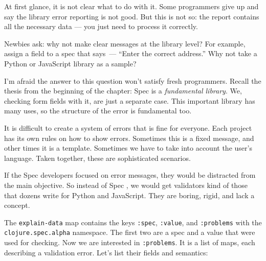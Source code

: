 
At first glance, it is not clear what to do with it. Some programmers give up and say the library error reporting is not good. But this is not so: the report contains all the necessary data — you just need to process it correctly.

Newbies ask: why not make clear messages at the library level? For example, assign a field to a spec that says~--- ``Enter the correct address.'' Why not take a Python or JavaScript library as a sample?


I'm afraid the answer to this question won't satisfy fresh programmers. Recall the thesis from the beginning of the chapter: Spec is a \emph{fundamental library}. We, checking form fields with it, are just a separate case. This important library has many uses, so the structure of the error is fundamental too.

It is difficult to create a system of errors that is fine for everyone. Each project has its own rules on how to show errors. Sometimes this is a fixed message, and other times it is a template. Sometimes we have to take into account the user's language. Taken together, these are sophisticated scenarios.

If the Spec developers focused on error messages, they would be distracted from the main objective. So instead of Spec , we would get validators kind of those that dozens write for Python and JavaScript. They are boring, rigid, and lack a concept.

The \verb|explain-data| map contains the keys \verb|:spec|, \verb|:value|, and \verb|:problems| with the \verb|clojure.spec.alpha| namespace. The first two are a spec and a value that were used for checking. Now we are interested in \verb|:problems|. It is a list of maps, each describing a validation error. Let's list their fields and semantics:


